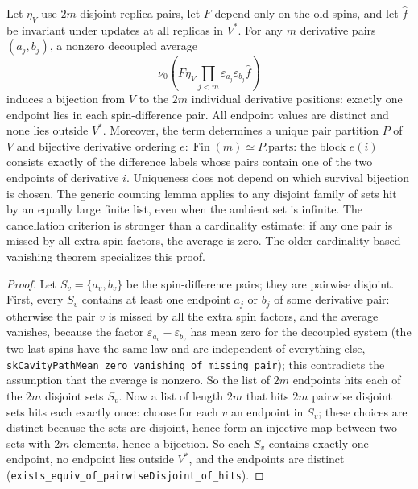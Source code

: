 \begin{lemma}\label{lem:sg-tal:hanen-critical-survival}
\leanok
{}
Let $\eta_V$ use $2m$ disjoint replica pairs, let $F$ depend only on the old spins,
and let $\hat f$ be invariant under updates at all replicas in $V^*$.
For any $m$ derivative pairs $(a_j,b_j)$, a nonzero decoupled average
\[
 \nu_0\left(F\eta_V\prod_{j<m}\varepsilon_{a_j}\varepsilon_{b_j}\hat f\right)
\]
induces a bijection from $V$ to the $2m$ individual derivative positions:
exactly one endpoint lies in each spin-difference pair. All endpoint values are
distinct and none lies outside $V^*$. Moreover, the term determines a unique
pair partition $P$ of $V$ and bijective derivative ordering $e:\operatorname{Fin}(m)\simeq P.\mathrm{parts}$:
the block $e(i)$ consists exactly of the difference labels whose pairs contain
one of the two endpoints of derivative $i$. Uniqueness does not depend on
which survival bijection is chosen.
The generic counting lemma applies to any disjoint family of sets hit by an
equally large finite list, even when the ambient set is infinite.
The cancellation criterion is stronger than a cardinality estimate: if any one
pair is missed by all extra spin factors, the average is zero. The older
cardinality-based vanishing theorem specializes this proof.
\end{lemma}
\begin{proof}
\leanok
Let $S_v=\{a_v,b_v\}$ be the spin-difference pairs; they are pairwise disjoint. First, every $S_v$ contains at least one endpoint $a_j$ or $b_j$ of some derivative pair:
otherwise the pair $v$ is missed by all the extra spin factors, and the average vanishes, because the factor $\varepsilon_{a_v}-\varepsilon_{b_v}$ has mean zero
for the decoupled system (the two last spins have the same law and are independent of everything else, \texttt{skCavityPathMean\_zero\_vanishing\_of\_missing\_pair}); this contradicts the assumption that the average is nonzero.
So the list of $2m$ endpoints hits each of the $2m$ disjoint sets $S_v$. Now a list of length $2m$ that hits $2m$ pairwise disjoint sets hits each exactly once:
choose for each $v$ an endpoint in $S_v$; these choices are distinct because the sets are disjoint, hence form an injective map between two sets with $2m$ elements, hence a bijection. So
each $S_v$ contains exactly one endpoint, no endpoint lies outside $V^*$, and the endpoints are distinct
(\texttt{exists\_equiv\_of\_pairwiseDisjoint\_of\_hits}).
\end{proof}

